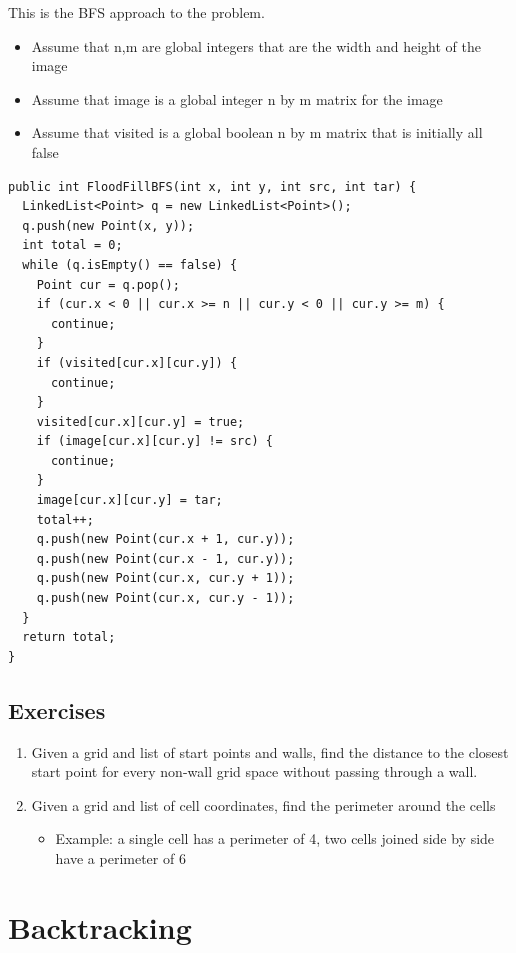 \documentclass[11pt,oneside]{book}
\begin{document}
This is the BFS approach to the problem.

\begin{itemize}
\item Assume that n,m are global integers that are the width and height of the image
\item Assume that image is a global integer n by m matrix for the image
\item Assume that visited is a global boolean n by m matrix that is initially all false
\end{itemize}

\begin{lstlisting}
public int FloodFillBFS(int x, int y, int src, int tar) {
  LinkedList<Point> q = new LinkedList<Point>();
  q.push(new Point(x, y));
  int total = 0;
  while (q.isEmpty() == false) {
    Point cur = q.pop();
    if (cur.x < 0 || cur.x >= n || cur.y < 0 || cur.y >= m) {
      continue;
    }
    if (visited[cur.x][cur.y]) {
      continue;
    }
    visited[cur.x][cur.y] = true;
    if (image[cur.x][cur.y] != src) {
      continue;
    }
    image[cur.x][cur.y] = tar;
    total++;
    q.push(new Point(cur.x + 1, cur.y));
    q.push(new Point(cur.x - 1, cur.y));
    q.push(new Point(cur.x, cur.y + 1));
    q.push(new Point(cur.x, cur.y - 1));
  }
  return total;
}
\end{lstlisting}

\subsection{Exercises}

\begin{enumerate}
\item Given a grid and list of start points and walls, find the distance to the closest start point for every non-wall grid space without passing through a wall.
\item Given a grid and list of cell coordinates, find the perimeter around the cells

\begin{itemize}
\item Example: a single cell has a perimeter of 4, two cells joined side by side have a perimeter of 6
\end{itemize}
\end{enumerate}

        \section{ Backtracking }
        
\end{document}

